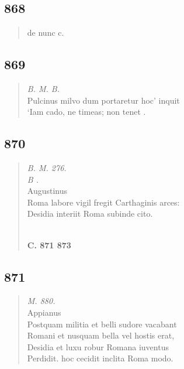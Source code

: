 \documentclass[11pt, a4paper]{report}
\begin{document}
            \subsection*{868}
      \begin{verse}
      de nunc c. \\ 
      \end{verse}
  
            \subsection*{869}
      \begin{verse}
      \textit{B. M. B.} \\ Pulcinus milvo dum portaretur hoc’ inquit \\ ‘Iam cado, ne timeas; non tenet . \\ 
      \end{verse}
  
            \subsection*{870}
      \begin{verse}
      \textit{B. M. 276.} \\ \textit{B .} \\ Augustinus \\ Roma labore vigil fregit Carthaginis arces: \\ Desidia interiit Roma subinde cito. \\ 
        ﻿\pagebreak 
    \begin{center} \textbf{C. 871 873} \end{center} \marginpar{[318]} 
      \end{verse}
  
            \subsection*{871}
      \begin{verse}
      \textit{M. 880.} \\ Appianus \\ Postquam militia et belli sudore vacabant \\ Romani et nusquam bella vel hostis erat, \\ Desidia et luxu robur Romana iuventus \\ Perdidit. hoc cecidit inclita Roma modo. \\ 
      \end{verse}
  
\end{document}
